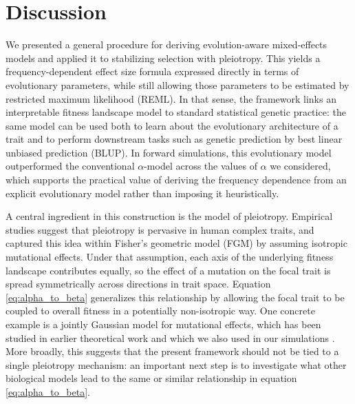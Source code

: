 \documentclass[10pt]{article}
\begin{document}
\section{Discussion}

We presented a general procedure for deriving evolution-aware mixed-effects models and applied it to stabilizing selection with pleiotropy. 
This yields a frequency-dependent effect size formula expressed directly in terms of evolutionary parameters, while still allowing those parameters to be estimated by restricted maximum likelihood (REML). 
In that sense, the framework links an interpretable fitness landscape model to standard statistical genetic practice: the same model can be used both to learn about the evolutionary architecture of a trait and to perform downstream tasks such as genetic prediction by best linear unbiased prediction (BLUP). 
In forward simulations, this evolutionary model outperformed the conventional $\alpha$-model across the values of $\alpha$ we considered, 
which supports the practical value of deriving the frequency dependence from an explicit evolutionary model rather than imposing it heuristically.

A central ingredient in this construction is the model of pleiotropy. 
Empirical studies suggest that pleiotropy is pervasive in human complex traits, 
and \citet{Simons2018popgeninterpretation} captured this idea within Fisher's geometric model (FGM) by assuming isotropic mutational effects. 
Under that assumption, each axis of the underlying fitness landscape contributes equally, so the effect of a mutation on the focal trait is spread symmetrically across directions in trait space. 
Equation \eqref{eq:alpha_to_beta} generalizes this relationship by allowing the focal trait to be coupled to overall fitness in a potentially non-isotropic way. One concrete example is a jointly Gaussian model for mutational effects, which has been studied in earlier theoretical work and which we also used in our simulations \citep{Kimura_1964, B_rger_1986, burger2000themathematicaltheoryof, walsh2018evolutionandselectionof}. 
More broadly, this suggests that the present framework should not be tied to a single pleiotropy mechanism: an important next step is to investigate what other biological models lead to the same or similar relationship in equation \eqref{eq:alpha_to_beta}.
\end{document}

